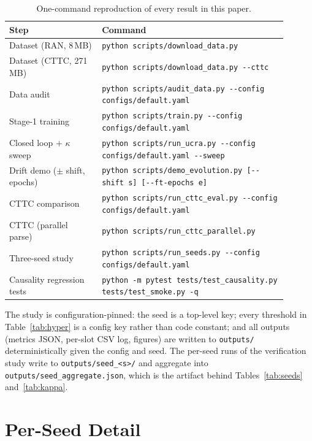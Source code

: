 \begin{table}[!t]
\caption{One-command reproduction of every result in this paper.}
\label{tab:commands}
\centering
\small
\setlength{\tabcolsep}{3pt}
\begin{tabular}{@{}p{0.30\linewidth}p{0.60\linewidth}@{}}
\toprule
Step & Command \\
\midrule
Dataset (RAN, 8\,MB) & \texttt{python scripts/download\_data.py} \\
Dataset (CTTC, 271\,MB) & \texttt{python scripts/download\_data.py -{}-cttc} \\
Data audit & \texttt{python scripts/audit\_data.py -{}-config configs/default.yaml} \\
Stage-1 training & \texttt{python scripts/train.py -{}-config configs/default.yaml} \\
Closed loop $+$ $\kappa$ sweep & \texttt{python scripts/run\_ucra.py -{}-config configs/default.yaml -{}-sweep} \\
Drift demo ($\pm$ shift, epochs) & \texttt{python scripts/demo\_evolution.py [-{}-shift s] [-{}-ft-epochs e]} \\
CTTC comparison & \texttt{python scripts/run\_cttc\_eval.py -{}-config configs/default.yaml} \\
CTTC (parallel parse) & \texttt{python scripts/run\_cttc\_parallel.py} \\
Three-seed study & \texttt{python scripts/run\_seeds.py -{}-config configs/default.yaml} \\
Causality regression tests & \texttt{python -m pytest tests/test\_causality.py tests/test\_smoke.py -q} \\
\bottomrule
\end{tabular}
\end{table}

The study is configuration-pinned: the seed is a top-level key; every
threshold in Table~\ref{tab:hyper} is a config key rather than code
constant; and all outputs (metrics JSON, per-slot CSV log, figures)
are written to \texttt{outputs/} deterministically given the config
and seed. The per-seed runs of the verification study write to
\texttt{outputs/seed\_<s>/} and aggregate into
\texttt{outputs/seed\_aggregate.json}, which is the artifact behind
Tables~\ref{tab:seeds} and~\ref{tab:kappa}.

\section{Per-Seed Detail}
\label{app:seeds}

